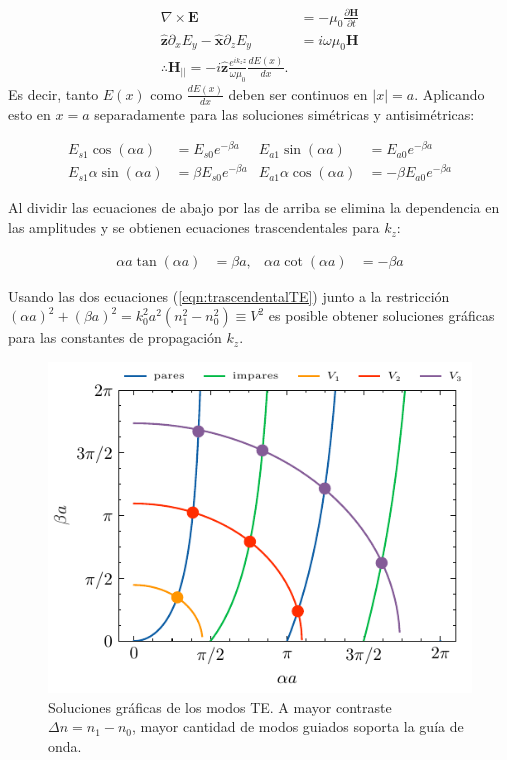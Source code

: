 \begin{align*}
	\nabla\times\textbf{E} &= -\mu_0\frac{\partial \textbf{H}}{\partial t}
	\\
	\mathbf{\hat{z}}\partial_x E_y-\mathbf{\hat{x}}\partial_z E_y  &= i\omega \mu_0  \textbf{H}
	\\	
	\therefore \textbf{H}_{||} = -i\mathbf{\hat{z}}\frac{e^{ik_z z}}{\omega\mu_0}\frac{d E(x)}{dx}.
\end{align*}
Es decir, tanto $E(x)$ como $\frac{dE(x)}{dx}$ deben ser continuos en $|x|=a$. Aplicando esto en $x=a$ separadamente para las soluciones simétricas y antisimétricas:

\begin{align*}
E_{s1}\cos(\alpha a) &= E_{s0} e^{-\beta a} & E_{a1}\sin(\alpha a) &= E_{a0} e^{-\beta a}
\\
E_{s1}\alpha\sin(\alpha a) &= \beta E_{s0} e^{-\beta a} & E_{a1}\alpha\cos(\alpha a) &= -\beta E_{a0} e^{-\beta a}
\end{align*}

Al dividir las ecuaciones de abajo por las de arriba se elimina la dependencia en las amplitudes y se obtienen ecuaciones trascendentales para $k_z$:

\begin{align}
	\alpha a \tan(\alpha a) &= \beta a, & \alpha a \cot(\alpha a) &= -\beta a \label{eqn:trascendentalTE}
\end{align}

Usando las dos ecuaciones (\ref{eqn:trascendentalTE}) junto a la restricción $(\alpha a)^2 + (\beta a)^2 = k_0^2 a^2(n_1^2 - n_0^2) \equiv V^2$ es posible obtener soluciones gráficas para las constantes de propagación $k_z$.

\begin{figure}[H]
	\centering
	\includegraphics[width=0.7\linewidth]{media/slabgraphical}
	\caption[Soluciones gráficas de los modos TE]{Soluciones gráficas de los modos TE. A mayor contraste $\Delta n = n_1-n_0$, mayor cantidad de modos guiados soporta la guía de onda.}
\end{figure}
